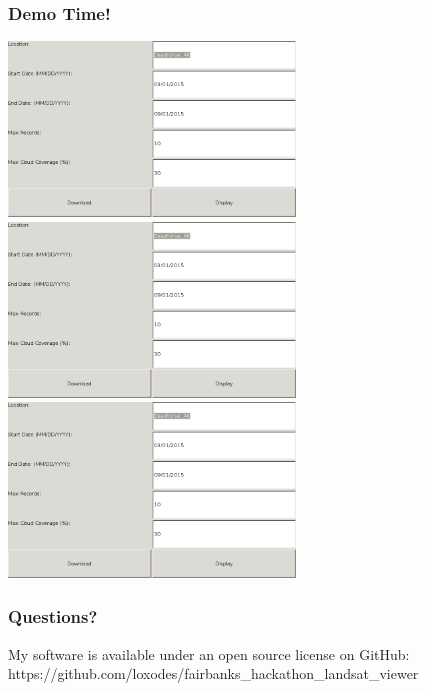 \documentclass{beamer}
\begin{document}
    \begin{frame}
        \frametitle{Demo Time!}
            \includegraphics[width=3in]{figures/gui.png}
            \includegraphics[width=3in]{figures/gui.png}
            \includegraphics[width=3in]{figures/gui.png}
    \end{frame}
    
    \begin{frame}
        \frametitle{Questions?}
        My software is available under an open source license on GitHub:
        https://github.com/loxodes/fairbanks\_hackathon\_landsat\_viewer
    \end{frame}
\end{document}
